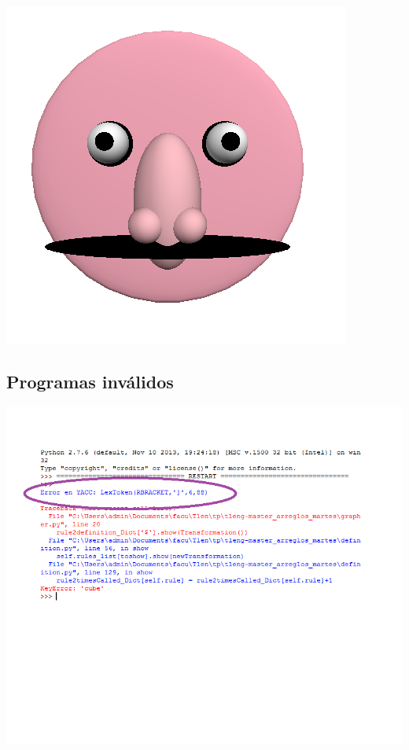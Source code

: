

\centerline{\includegraphics[scale=0.40]{../imagenes/cara.png}}

\newpage

\subsection{Programas inv\'alidos}



\centerline{\includegraphics[scale=0.70]{../imagenes/eg22invalid.png}}

